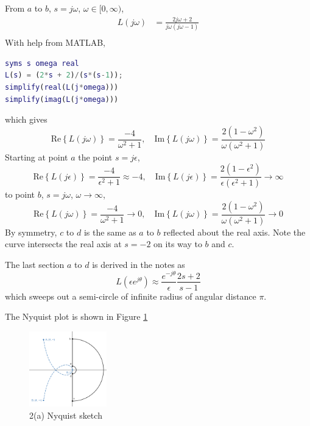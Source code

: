 From $a$ to $b$, $s = j \omega$, $\omega \in [0, \infty)$,
\begin{align*}
    L(j \omega) &= \frac{2j \omega + 2}{j \omega (j \omega - 1)} \\
\end{align*}
With help from MATLAB, 
\begin{lstlisting}[language=Matlab]
syms s omega real
L(s) = (2*s + 2)/(s*(s-1));
simplify(real(L(j*omega)))
simplify(imag(L(j*omega)))
\end{lstlisting}
which gives
\begin{equation*}
    \text{Re} \left\{ L(j \omega) \right\} = \frac{-4}{\omega^2 + 1}, \quad \text{Im} \left\{ L(j \omega) \right\} = \frac{2 (1 - \omega^2)}{\omega (\omega^2 + 1)}
\end{equation*}
Starting at point $a$ the point $s = j \epsilon$, 
\begin{equation*}
    \text{Re} \left\{ L(j \epsilon) \right\} = \frac{-4}{\epsilon^2 + 1} \approx -4, \quad \text{Im} \left\{ L(j \epsilon) \right\} 
    = \frac{2 (1 - \epsilon^2)}{\epsilon (\epsilon^2 + 1)} \to \infty
\end{equation*}
to point $b$, $s = j \omega$, $\omega \to \infty$,
\begin{equation*}
    \text{Re} \left\{ L(j \omega) \right\} = \frac{-4}{\omega^2 + 1} \to 0, \quad \text{Im} \left\{ L(j \omega) \right\} 
    = \frac{2 (1 - \omega^2)}{\omega (\omega^2 + 1)} \to 0
\end{equation*}
By symmetry, $c$ to $d$ is the same as $a$ to $b$ reflected about the real axis. Note the curve intersects the real axis at $s = -2$ on its 
way to $b$ and $c$.

The last section $a$ to $d$ is derived in the notes as 
\begin{equation*}
    L(\epsilon e^{j \theta}) \approx \frac{e^{-j \theta}}{\epsilon} \frac{2s + 2}{s-1}
\end{equation*}
which sweeps out a semi-circle of infinite radius of angular distance $\pi$. 

The Nyquist plot is shown in Figure \ref{fig:Q2Sketch}
\begin{figure}[h]
    \centering
    \includegraphics[width=0.3\textwidth]{Questions/Figures/Q2Sketch.png}
    \caption{2(a) Nyquist sketch}
    \label{fig:Q2Sketch}
\end{figure}

